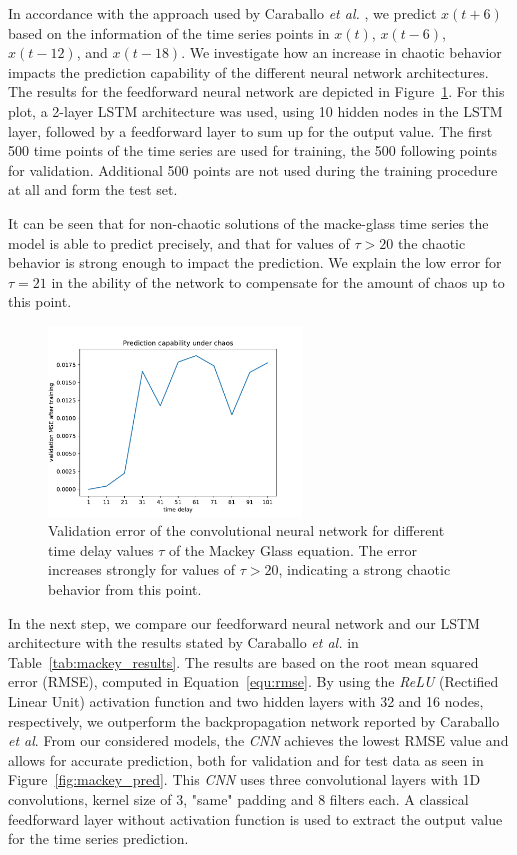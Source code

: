 \documentclass{article}
\begin{document}
In accordance with the approach used by Caraballo \textit{et al.}
\cite{caraballo2016}, we predict $x(t+6)$ based on the information of the time
series points in $x(t)$, $x(t-6)$, $x(t-12)$, and $x(t-18)$. We investigate how
an increase in chaotic behavior impacts the prediction capability of the
different neural network architectures. The results for the feedforward neural
network are depicted in Figure~\ref{fig:mackey_cnn}. For this plot, a 2-layer
LSTM architecture was used, using 10 hidden nodes in the LSTM layer,
followed by a feedforward layer to sum up for the output value.
The first 500 time points of the time series are used for training, the 500
following points for validation. Additional 500 points are not used during the
training procedure at all and form the test set.

It can be seen that for non-chaotic solutions of the macke-glass time series the
model is able to predict precisely, and that for values of $\tau > 20$ the
chaotic behavior is strong enough to impact the prediction. We explain the low
error for $\tau = 21$ in the ability of the network to compensate for the amount
of chaos up to this point.

\begin{figure}
  \centering
  \includegraphics[width=0.6\textwidth]{figures/mackey_glass_cnn.pdf}
  \caption{Validation error of the convolutional neural network for different
    time delay values $\tau$ of the Mackey Glass equation. The error increases
    strongly for values of $\tau > 20$, indicating a strong chaotic behavior
    from this point.}
  \label{fig:mackey_cnn}
\end{figure}

In the next step, we compare our feedforward neural network and our LSTM
architecture with the results stated by Caraballo \textit{et al.}
\cite{caraballo2016} in Table~\ref{tab:mackey_results}. The results are based
on the root mean squared error (RMSE), computed in Equation~\ref{equ:rmse}. By 
using the \emph{ReLU} (Rectified Linear Unit) activation function and two
hidden layers with 32 and 16 nodes, respectively, we outperform the 
backpropagation network reported by Caraballo \textit{et al}. 
From our considered models, the \emph{CNN} achieves the lowest RMSE value and
allows for accurate prediction, both for validation and for test data as seen
in Figure~\ref{fig:mackey_pred}. This \emph{CNN} uses three convolutional layers
with 1D convolutions, kernel size of 3, "same" padding and 8
filters each. A classical
feedforward layer without activation function is used to extract the output
value for the time series prediction.
\end{document}

